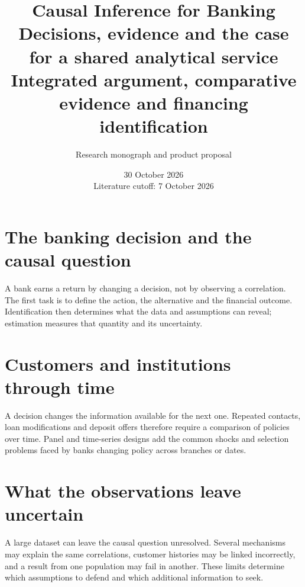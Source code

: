 \documentclass[11pt,a4paper,openany]{book}
\title{\sffamily\bfseries\color{ink}Causal Inference for Banking\\[14pt]
\Large Decisions, evidence and the case for a shared analytical service\\[8pt]\large Integrated argument, comparative evidence and financing identification}
\author{Research monograph and product proposal}
\date{30 October 2026\\Literature cutoff: 7 October 2026}
\begin{document}
\frontmatter
\maketitle

\begingroup\setlength{\parskip}{0pt}\tableofcontents\endgroup
\mainmatter
\part{The banking decision and the causal question}
\label{reading:part-decision}
A bank earns a return by changing a decision, not by observing a correlation.
The first task is to define the action, the alternative and the financial outcome.
Identification then determines what the data and assumptions can reveal;
estimation measures that quantity and its uncertainty.







\part{Customers and institutions through time}
\label{reading:part-time}
A decision changes the information available for the next one. Repeated
contacts, loan modifications and deposit offers therefore require a comparison
of policies over time. Panel and time-series designs add the common shocks
and selection problems faced by banks changing policy across branches or dates.












\part{What the observations leave uncertain}
\label{reading:part-uncertainty}
A large dataset can leave the causal question unresolved. Several mechanisms
may explain the same correlations, customer histories may be linked incorrectly,
and a result from one population may fail in another. These limits determine
which assumptions to defend and which additional information to seek.
\end{document}
